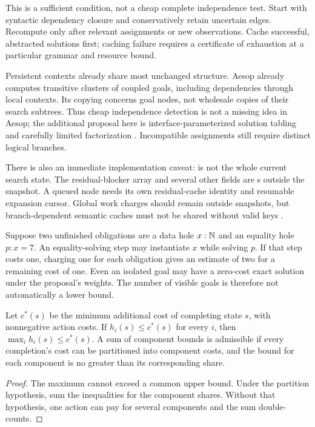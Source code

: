 This is a sufficient condition, not a cheap complete independence test.
Start with syntactic dependency closure and conservatively retain uncertain
edges. Recompute only after relevant assignments or new observations. Cache
successful, abstracted solutions first; caching failure requires a certificate
of exhaustion at a particular grammar and resource bound.

Persistent contexts already share most unchanged structure. Aesop already
computes transitive clusters of coupled goals, including dependencies through
local contexts. Its copying concerns goal nodes, not wholesale copies of their
search subtrees. Thus cheap independence detection is not a missing idea in
Aesop; the additional proposal here is interface-parameterized solution
tabling and carefully limited factorization \cite{aesop}. Incompatible
assignments still require distinct logical branches.

There is also an immediate implementation caveat:  is
not the whole current search state. The residual-blocker array and several
other fields are s outside the snapshot. A queued node needs its
own residual-cache identity and resumable expansion cursor. Global work
charges should remain outside snapshots, but branch-dependent semantic caches
must not be shared without valid keys \cite{searchcode,transactioncode}.


Suppose two unfinished obligations are a data hole $x:\mathbb{N}$ and an equality
hole $p:x=7$. An equality-solving step may instantiate $x$ while solving $p$.
If that step costs one, charging one for each obligation gives an estimate of
two for a remaining cost of one. Even an isolated goal may have a zero-cost
exact solution under the proposal's weights. The number of visible goals is
therefore not automatically a lower bound.

\begin{proposition}\label{prop:heuristic}
Let $c^*(s)$ be the minimum additional cost of completing state $s$, with
nonnegative action costs. If $h_i(s)\le c^*(s)$ for every $i$, then
$\max_i h_i(s)\le c^*(s)$. A sum of component bounds is admissible if every
completion's cost can be partitioned into component costs, and the bound for
each component is no greater than its corresponding share.
\end{proposition}
\begin{proof}
The maximum cannot exceed a common upper bound. Under the partition
hypothesis, sum the inequalities for the component shares. Without that
hypothesis, one action can pay for several components and the sum double-counts.
\end{proof}

